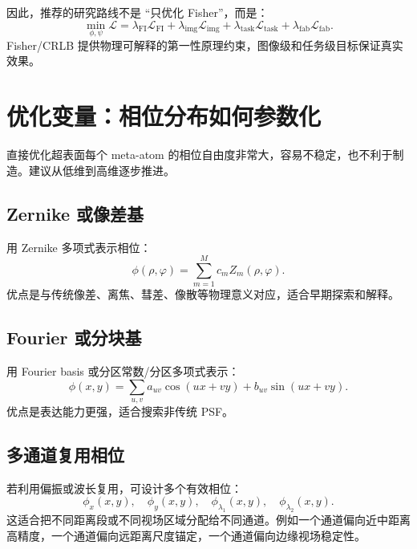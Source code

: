 \documentclass[11pt,a4paper,fontset=none]{ctexart}
\begin{document}
因此，推荐的研究路线不是 ``只优化 Fisher''，而是：
\begin{equation}
  \min_{\phi,\psi}
  \mathcal L =
  \lambda_{\mathrm{FI}}\mathcal L_{\mathrm{FI}}
  + \lambda_{\mathrm{img}}\mathcal L_{\mathrm{img}}
  + \lambda_{\mathrm{task}}\mathcal L_{\mathrm{task}}
  + \lambda_{\mathrm{fab}}\mathcal L_{\mathrm{fab}}.
  \label{eq:full_objective}
\end{equation}
Fisher/CRLB 提供物理可解释的第一性原理约束，图像级和任务级目标保证真实效果。

\section{优化变量：相位分布如何参数化}

直接优化超表面每个 meta-atom 的相位自由度非常大，容易不稳定，也不利于制造。建议从低维到高维逐步推进。

\subsection{Zernike 或像差基}

用 Zernike 多项式表示相位：
\begin{equation}
  \phi(\rho,\varphi)=
  \sum_{m=1}^{M} c_m Z_m(\rho,\varphi).
\end{equation}
优点是与传统像差、离焦、彗差、像散等物理意义对应，适合早期探索和解释。

\subsection{Fourier 或分块基}

用 Fourier basis 或分区常数/分区多项式表示：
\begin{equation}
  \phi(x,y)=
  \sum_{u,v} a_{uv}\cos(ux+vy)+b_{uv}\sin(ux+vy).
\end{equation}
优点是表达能力更强，适合搜索非传统 PSF。

\subsection{多通道复用相位}

若利用偏振或波长复用，可设计多个有效相位：
\begin{equation}
  \phi_x(x,y),\quad \phi_y(x,y),\quad
  \phi_{\lambda_1}(x,y),\quad \phi_{\lambda_2}(x,y).
\end{equation}
这适合把不同距离段或不同视场区域分配给不同通道。例如一个通道偏向近中距离高精度，一个通道偏向远距离尺度锚定，一个通道偏向边缘视场稳定性。
\end{document}
